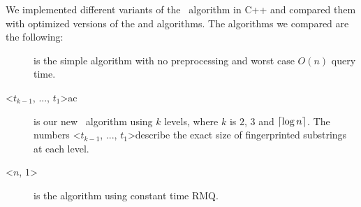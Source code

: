 \documentclass[a4]{article}
\begin{document}
\ifarticle

We implemented different variants of the \fprintk\ algorithm in C++ and compared them with optimized versions of the  and  algorithms. The algorithms we compared are the following:
\begin{description}
\item[] is the simple  algorithm with no preprocessing and worst case $O(n)$ query time.
\item[\fprintk\textless$t_{k-1}$, ..., $t_1$\textgreater ac] is our new \fprintk\ algorithm using $k$ levels, where $k$ is $2$, $3$ and $\lceil\log n\rceil$. The numbers \textless$t_{k-1}$, ..., $t_1$\textgreater describe the exact size of fingerprinted substrings at each level.
\item[\textless$n$, $1$\textgreater] is the  algorithm using constant time RMQ.
\end{description}

\fi %

\ifreport
\end{document}
